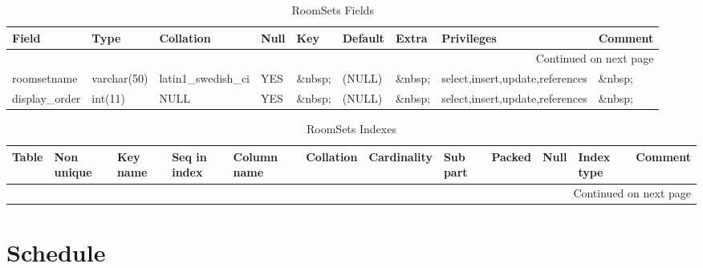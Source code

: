 \documentclass[tablesignature]{scrartcl}
\begin{document}
\begin{longtable}{|l|l|l|l|l|l|l|l|l|}
\caption{RoomSets Fields} \label{tbl:roomsetsfields}\\
\hline
 Field             &  Type         &  Collation                &  Null     &  Key      &  Default  &  Extra              &  Privileges                       &  Comment \\
\hline
\endhead
\hline\multicolumn{9}{r}{Continued on next page}\
\endfoot
\endlastfoot
\hline
 roomsetid         &  int(11)      &  NULL                     &  \&nbsp;  &  PRI      &  (NULL)   &  auto\_{}increment  &  select,insert,update,references  &  \&nbsp;  \\
 roomsetname       &  varchar(50)  &  latin1\_{}swedish\_{}ci  &  YES      &  \&nbsp;  &  (NULL)   &  \&nbsp;            &  select,insert,update,references  &  \&nbsp;  \\
 display\_{}order  &  int(11)      &  NULL                     &  YES      &  \&nbsp;  &  (NULL)   &  \&nbsp;            &  select,insert,update,references  &  \&nbsp;  \\
\hline
\end{longtable}


\begin{longtable}{|l|l|l|l|l|l|l|l|l|l|l|l|}
\caption{RoomSets Indexes} \label{tbl:roomsetsindexes}\\
\hline
 Table     &  Non unique  &  Key name  &  Seq in index  &  Column name  &  Collation  &  Cardinality  &  Sub part  &  Packed  &  Null     &  Index type  &  Comment \\
\hline
\endhead
\hline\multicolumn{12}{r}{Continued on next page}\
\endfoot
\endlastfoot
\hline
 RoomSets  &           0  &  PRIMARY   &             1  &  roomsetid    &  A          &           12  &  (NULL)    &  (NULL)  &  \&nbsp;  &  BTREE       &  \&nbsp;  \\
\hline
\end{longtable}
\section{Schedule}
\label{sec-24}
\end{document}
